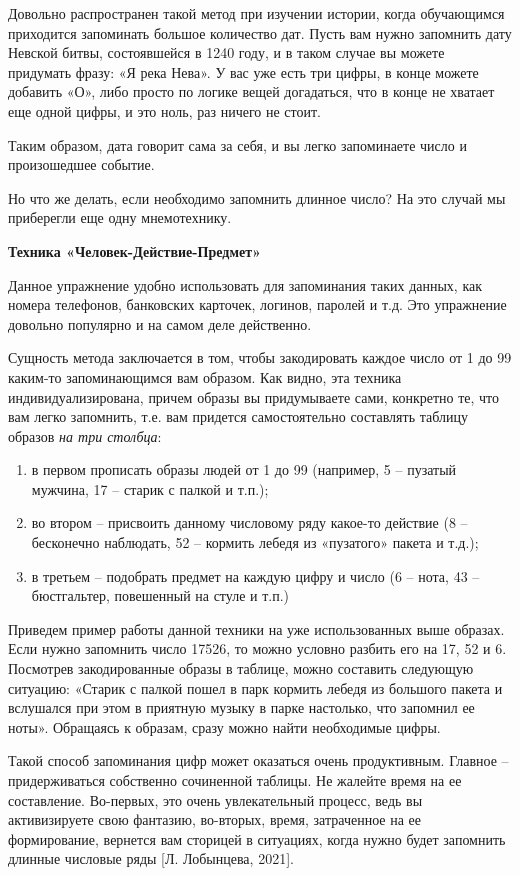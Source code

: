 Довольно распространен такой метод при изучении истории, когда обучающимся приходится запоминать большое количество дат. Пусть вам нужно запомнить дату Невской битвы, состоявшейся в 1240 году, и в таком случае вы можете придумать фразу: «Я река Нева». У вас уже есть три цифры, в конце можете добавить «О», либо просто по логике вещей догадаться, что в конце не хватает еще одной цифры, и это ноль, раз ничего не стоит.

Таким образом, дата говорит сама за себя, и вы легко запоминаете число и произошедшее событие.

Но что же делать, если необходимо запомнить длинное число? На это случай мы приберегли еще одну мнемотехнику.

\textbf{Техника «Человек-Действие-Предмет»}

Данное упражнение удобно использовать для запоминания таких данных, как номера телефонов, банковских карточек, логинов, паролей и т.д. Это упражнение довольно популярно и на самом деле действенно.

Сущность метода заключается в том, чтобы закодировать каждое число от 1 до 99 каким-то запоминающимся вам образом. Как видно, эта техника индивидуализирована, причем образы вы придумываете сами, конкретно те, что вам легко запомнить, т.е. вам придется самостоятельно составлять таблицу образов \textit{на три столбца}:

\begin{enumerate}
    \item в первом прописать образы людей от 1 до 99 (например, 5 – пузатый мужчина, 17 – старик с палкой и т.п.);
    \item во втором – присвоить данному числовому ряду какое-то действие (8 – бесконечно наблюдать, 52 – кормить лебедя из «пузатого» пакета и т.д.);
    \item в третьем – подобрать предмет на каждую цифру и число (6 – нота, 43 – бюстгальтер, повешенный на стуле и т.п.)
\end{enumerate}

Приведем пример работы данной техники на уже использованных выше образах. Если нужно запомнить число 17526, то можно условно разбить его на 17, 52 и 6. Посмотрев закодированные образы в таблице, можно составить следующую ситуацию: «Старик с палкой пошел в парк кормить лебедя из большого пакета и вслушался при этом в приятную музыку в парке настолько, что запомнил ее ноты». Обращаясь к образам, сразу можно найти необходимые цифры.

Такой способ запоминания цифр может оказаться очень продуктивным. Главное – придерживаться собственно сочиненной таблицы. Не жалейте время на ее составление. Во-первых, это очень увлекательный процесс, ведь вы активизируете свою фантазию, во-вторых, время, затраченное на ее формирование, вернется вам сторицей в ситуациях, когда нужно будет запомнить длинные числовые ряды [Л. Лобынцева, 2021].


